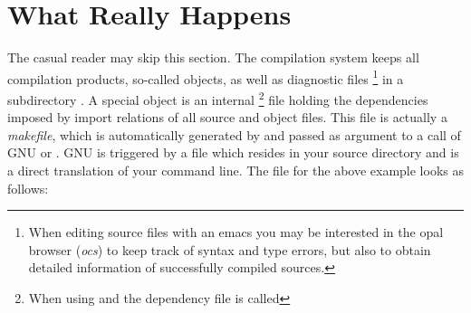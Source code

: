 \section{What Really Happens}
\label{sec:real}
The casual reader may skip this section. 
The \opal{} compilation system keeps all compilation products, so-called
objects, as well as diagnostic files \footnote 
{When editing source files with an emacs you may be interested in the
opal browser ({\it ocs\/}) to
keep track of syntax and type errors, but also to obtain detailed information
of successfully compiled sources.} in a subdirectory . A
special object is an internal 
 \footnote{When using  and 
  the dependency file is called } 
file holding the dependencies imposed by import relations of all source
and object files.  
This  file is actually a 
{\em makefile}, which is automatically generated by  and passed as argument to a call of GNU
 or . GNU  is triggered by a  file 
which resides in your source directory and is a
direct translation of your  command line. The  file
for the above example looks as follows:




